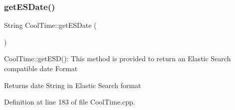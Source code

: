 \subsubsection{\texorpdfstring{get\+E\+S\+Date()}{getESDate()}}
{\footnotesize\ttfamily String Cool\+Time\+::get\+E\+S\+Date (\begin{DoxyParamCaption}{ }\end{DoxyParamCaption})}

Cool\+Time\+::get\+E\+S\+D()\+: This method is provided to return an Elastic Search compatible date Format

\begin{DoxyReturn}{Returns}
date String in Elastic Search format 
\end{DoxyReturn}


Definition at line 183 of file Cool\+Time.\+cpp.


